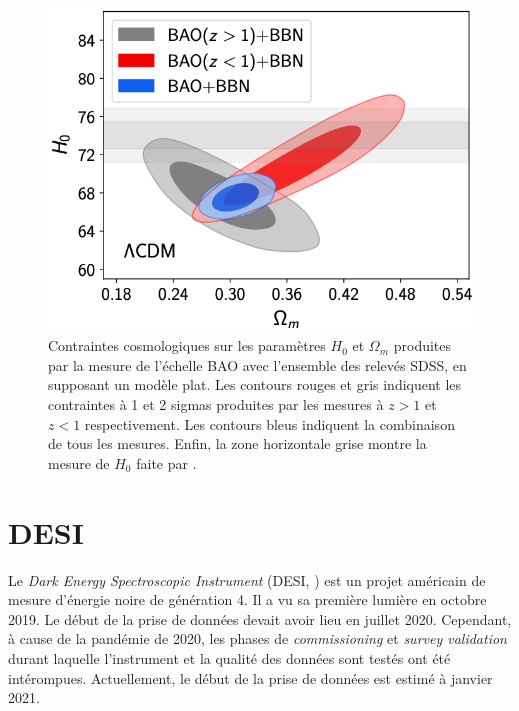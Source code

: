 \begin{figure}
  \centering
  \includegraphics[scale=0.45]{hzero_om}
  \caption{Contraintes cosmologiques sur les paramètres $H_0$ et $\Omega_{m}$ produites par la mesure de l'échelle BAO avec l'ensemble des relevés SDSS, en supposant un modèle \lcdm{} plat. Les contours rouges et gris indiquent les contraintes à 1 et 2 sigmas produites par les mesures à $z > 1$ et $z < 1$ respectivement. Les contours bleus indiquent la combinaison de tous les mesures. Enfin, la zone horizontale grise montre la mesure de $H_0$ faite par \textcite{Riess2019}.}
  \label{fig:h0_om}
\end{figure}


\section{DESI}

Le \emph{Dark Energy Spectroscopic Instrument} (DESI, \textcite{DESICollaboration2016}) est un projet américain de mesure d'énergie noire de génération 4.
Il a vu sa première lumière en octobre 2019. %
Le début de la prise de données devait avoir lieu en juillet 2020. Cependant, à cause de la pandémie de 2020, les phases de \emph{commissioning} et \emph{survey validation} durant laquelle l'instrument et  la qualité des données sont testés ont été intérompues. Actuellement, le début de la prise de données est estimé à janvier 2021.


